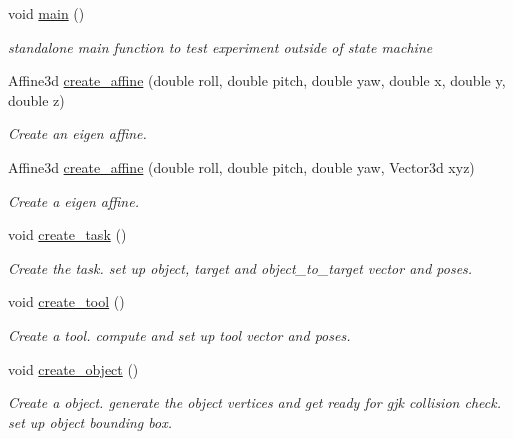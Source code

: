 \begin{DoxyCompactItemize}
\mbox{\label{classTool__Expt_a9a0a2083192ef14bac6290b6635a28ed}} 
void \hyperlink{classTool__Expt_a9a0a2083192ef14bac6290b6635a28ed}{main} ()
\begin{DoxyCompactList}\small\item\em standalone main function to test experiment outside of state machine \end{DoxyCompactList}\item 
Affine3d \hyperlink{classTool__Expt_a6d0d9c6287de98e81b26dff9e0e56863}{create\+\_\+affine} (double roll, double pitch, double yaw, double x, double y, double z)
\begin{DoxyCompactList}\small\item\em Create an eigen affine. \end{DoxyCompactList}\item 
Affine3d \hyperlink{classTool__Expt_a759fb0ce1b71d3153378e7897bef6f72}{create\+\_\+affine} (double roll, double pitch, double yaw, Vector3d xyz)
\begin{DoxyCompactList}\small\item\em Create a eigen affine. \end{DoxyCompactList}\item 
\mbox{\label{classTool__Expt_ad17747000a73814a34841eecda0ccc6a}} 
void \hyperlink{classTool__Expt_ad17747000a73814a34841eecda0ccc6a}{create\+\_\+task} ()
\begin{DoxyCompactList}\small\item\em Create the task. set up object, target and object\+\_\+to\+\_\+target vector and poses. \end{DoxyCompactList}\item 
\mbox{\label{classTool__Expt_ae15dbe96d503e8c03cb86d9f8e58937c}} 
void \hyperlink{classTool__Expt_ae15dbe96d503e8c03cb86d9f8e58937c}{create\+\_\+tool} ()
\begin{DoxyCompactList}\small\item\em Create a tool. compute and set up tool vector and poses. \end{DoxyCompactList}\item 
\mbox{\label{classTool__Expt_ae4e9248dd93aa40ad2dd8ae11cf694b7}} 
void \hyperlink{classTool__Expt_ae4e9248dd93aa40ad2dd8ae11cf694b7}{create\+\_\+object} ()
\begin{DoxyCompactList}\small\item\em Create a object. generate the object vertices and get ready for gjk collision check. set up object bounding box. \end{DoxyCompactList}\item 

\end{DoxyCompactItemize}
